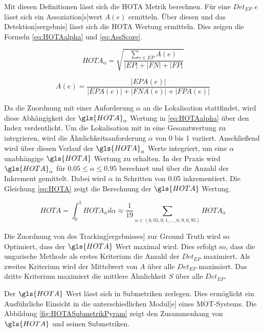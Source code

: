 
Mit diesen Definitionen lässt sich die \gls{HOTA} Metrik berechnen. Für eine \(Det_{EP}\) \(e\) lässt sich ein \gls{Assoziation}[s]wert \(A(e)\) ermitteln. Über diesen und das \gls{Detektion}[sergebnis] lässt sich die \gls{HOTA} Wertung ermitteln. Dies zeigen die Formeln \ref{eq:HOTAalpha} und \ref{eq:AssScore}.

\begin{equation}
    \label{eq:HOTAalpha}
    HOTA_{\alpha} = \sqrt{\frac{\sum_{e \in EP} A(e)}{|EP| + |FN| + |FP|}}
\end{equation}

\begin{equation}
    \label{eq:AssScore}
    A(e) = \frac{|EPA(e)|}{|EPA(e)| + |FNA(e)| + |FPA(e)|}
\end{equation}

Da die Zuordnung mit einer Anforderung \(\alpha\) an die \gls{Lokalisation} stattfindet, wird diese Abhängigkeit der \(\gls{HOTA}_{\alpha}\) Wertung in \ref{eq:HOTAalpha} über den Index verdeutlicht. Um die \gls{Lokalisation} mit in eine Gesamtwertung zu integrieren, wird die Ähnlichkeitsanforderung \(\alpha\) von 0 bis 1 variiert. Anschließend wird über diesen Verlauf der \(\gls{HOTA}_{\alpha}\) Werte integriert, um eine \(\alpha\) unabhängige \(\gls{HOTA}\) Wertung zu erhalten. In der Praxis wird \(\gls{HOTA}_{\alpha}\) für \(0.05 \leq \alpha \leq 0.95\) berechnet und über die Anzahl der Inkrement gemittelt. Dabei wird \(\alpha\) in Schritten von 0.05 inkrementiert. Die Gleichung \ref{eq:HOTA} zeigt die Berechnung der \(\gls{HOTA}\) Wertung.

\begin{equation}
    \label{eq:HOTA}
    HOTA = \int_{0}^{1} HOTA_{\alpha} d\alpha \approx \frac{1}{19} \sum_{\alpha \in (0,05, 0,1, \dots, 0,9, 0,95)} HOTA_{\alpha}
\end{equation}

Die Zuordnung von des \gls{Tracking}[ergebnisses] zur \gls{Ground Truth} wird so Optimiert, dass der \(\gls{HOTA}\) Wert maximal wird. Dies erfolgt so, dass die ungarische Methode als erstes Kriterium die Anzahl der \({Det_{EP}}\) maximiert. Als zweites Kriterium wird der Mittelwert von \(A\) über alle \({Det_{EP}}\) maximiert. Das dritte Kriterium maximiert die mittlere Ähnlichkeit \(S\) über alle \({Det_{EP}}\).\par

Der \(\gls{HOTA}\) Wert lässt sich in Submetriken zerlegen. Dies ermöglicht ein Ausführliche Einsicht in die unterschiedlichen \gls{Modul}[e] eines \gls{MOT}-Systems. Die Abbildung \ref{fig:HOTASubmetrikPyram} zeigt den Zusammenhang von \(\gls{HOTA}\) und seinen Submetriken. 


